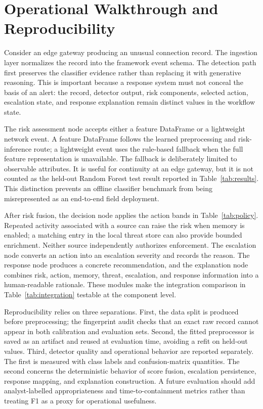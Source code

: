 \documentclass[conference]{IEEEtran}
\begin{document}
\section{Operational Walkthrough and Reproducibility}
Consider an edge gateway producing an unusual connection record. The ingestion layer normalizes the record into the framework event schema. The detection path first preserves the classifier evidence rather than replacing it with generative reasoning. This is important because a response system must not conceal the basis of an alert: the record, detector output, risk components, selected action, escalation state, and response explanation remain distinct values in the workflow state.

The risk assessment node accepts either a feature DataFrame or a lightweight network event. A feature DataFrame follows the learned preprocessing and risk-inference route; a lightweight event uses the rule-based fallback when the full feature representation is unavailable. The fallback is deliberately limited to observable attributes. It is useful for continuity at an edge gateway, but it is not counted as the held-out Random Forest test result reported in Table~\ref{tab:results}. This distinction prevents an offline classifier benchmark from being misrepresented as an end-to-end field deployment.

After risk fusion, the decision node applies the action bands in Table~\ref{tab:policy}. Repeated activity associated with a source can raise the risk when memory is enabled; a matching entry in the local threat store can also provide bounded enrichment. Neither source independently authorizes enforcement. The escalation node converts an action into an escalation severity and records the reason. The response node produces a concrete recommendation, and the explanation node combines risk, action, memory, threat, escalation, and response information into a human-readable rationale. These modules make the integration comparison in Table~\ref{tab:integration} testable at the component level.

Reproducibility relies on three separations. First, the data split is produced before preprocessing; the fingerprint audit checks that an exact raw record cannot appear in both calibration and evaluation sets. Second, the fitted preprocessor is saved as an artifact and reused at evaluation time, avoiding a refit on held-out values. Third, detector quality and operational behavior are reported separately. The first is measured with class labels and confusion-matrix quantities. The second concerns the deterministic behavior of score fusion, escalation persistence, response mapping, and explanation construction. A future evaluation should add analyst-labelled appropriateness and time-to-containment metrics rather than treating F1 as a proxy for operational usefulness.
\end{document}
